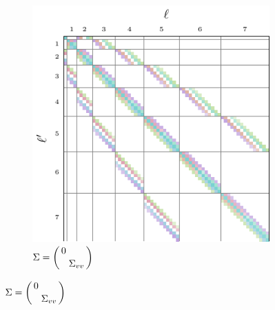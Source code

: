 \documentclass[../../main.tex]{subfiles}
\begin{document}
\begin{refsection}
\begin{figure}
\begin{subfigure}[b]{0.31\textwidth}
		\end{subfigure}
		\hfill
		\begin{subfigure}[b]{0.31\textwidth}
			\centering
			\caption{$\Sigma = \smqty(\dmat{0, \Sigma_{vv}})$}
			\includegraphics[width=\textwidth]{Bmat_se3_trans.pdf}
		\end{subfigure}


\end{figure}
\end{refsection}
\end{document}
